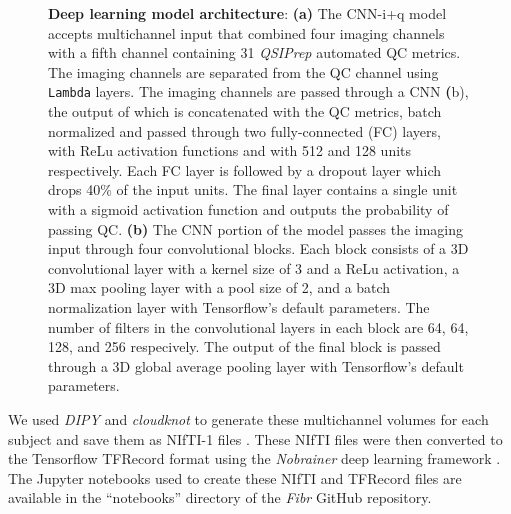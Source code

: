 \documentclass[fleqn,10pt]{wlscirep}
\begin{document}
\begin{figure}[tbp]
\begin{subfigure}[t]{0.4\textwidth}
    \end{subfigure}
    \caption{%
        {\bf Deep learning model architecture}:
        \textbf{(a)} The CNN-i+q model accepts multichannel input that combined
        four imaging channels with a fifth channel containing 31 \emph{QSIPrep}
        automated QC metrics.  The imaging channels are separated from the QC
        channel using \texttt{Lambda} layers. The imaging channels are passed
        through a CNN \textbf(b), the output of which is concatenated with the
        QC metrics, batch normalized and passed through two fully-connected (FC)
        layers, with ReLu activation functions and with 512 and 128 units
        respectively. Each FC layer is followed by a dropout layer which drops
        40\% of the input units. The final layer contains a single unit with a
        sigmoid activation function and outputs the probability of passing QC.
        \textbf{(b)} The CNN portion of the model passes the imaging input
        through four convolutional blocks. Each block consists of a 3D
        convolutional layer with a kernel size of 3 and a ReLu activation, a 3D
        max pooling layer with a pool size of 2, and a batch normalization layer
        with Tensorflow's default parameters.  The number of filters in the
        convolutional layers in each block are 64, 64, 128, and 256 respecively.
        The output of the final block is passed through a 3D global average
        pooling layer with Tensorflow's default parameters.
    }
    \label{fig:dl-architecture}
\end{figure}

We used \emph{DIPY} \cite{dipy} and \emph{cloudknot} \cite{cloudknot} to
generate these multichannel volumes for each subject and save them as NIfTI-1
files \cite{nifti}. These NIfTI files were then converted to the Tensorflow
TFRecord format using the \emph{Nobrainer} deep learning framework
\cite{nobrainer}.
The Jupyter notebooks used to create these NIfTI and TFRecord files are
available in the ``notebooks'' directory of the \emph{Fibr} GitHub
repository.
\end{document}
